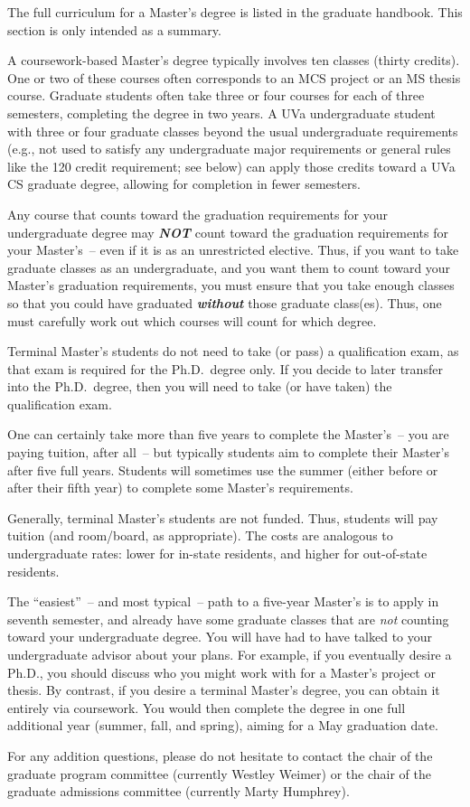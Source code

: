 
The full curriculum for a Master's degree is listed in the graduate
handbook.
This section is only intended as a summary.

A coursework-based Master's degree typically involves ten classes (thirty
credits). One or two of these courses often corresponds to an MCS project
or an MS thesis course.  Graduate students often take three or four courses
for each of three semesters, completing the degree in two years. A UVa
undergraduate student with three or four graduate classes beyond the usual
undergraduate requirements (e.g., not used to satisfy any undergraduate
major requirements or general rules like the 120 credit requirement; see
below) can apply those credits toward a UVa CS graduate degree, allowing
for completion in fewer semesters. 

Any course that counts toward the graduation requirements for your
undergraduate degree may {\em\bf NOT} count toward the graduation
requirements for your Master's~-- even if it is as an unrestricted
elective.  Thus, if you want to take graduate classes as an undergraduate,
and you want them to count toward your Master's graduation requirements,
you must ensure that you take enough classes so that you could have
graduated {\em\bf without} those graduate class(es).  Thus, one must
carefully work out which courses will count for which degree. 

Terminal Master's students do not need to take (or pass) a qualification
exam, as that exam is required for the Ph.D.\ degree only.  If you decide
to later transfer into the Ph.D.\ degree, then you will need to take (or
have taken) the qualification exam.

One can certainly take more than five years to complete the Master's~--
you are paying tuition, after all~-- but typically students aim to
complete their Master's after five full years. Students will sometimes use
the summer (either before or after their fifth year) to complete some
Master's requirements.  


Generally, terminal Master's students are not funded.  Thus, students will
pay tuition (and room/board, as appropriate).  The costs are analogous to
undergraduate rates: lower for in-state residents, and higher for
out-of-state residents.

The ``easiest''~-- and most typical~-- path to a five-year Master's is to
apply in seventh semester, and already have some graduate classes that are
\emph{not} counting toward your undergraduate degree. You will have had to
have talked to your undergraduate advisor about your plans. For example,
if you eventually desire a Ph.D., you should discuss who you might work
with for a Master's project or thesis. By contrast, if you desire a
terminal Master's degree, you can obtain it entirely via coursework. 
You would then complete the degree in one full additional year (summer,
fall, and spring), aiming for a May graduation date.

For any addition questions, please do not hesitate to contact the chair of
the graduate program committee (currently Westley Weimer) or the chair of
the graduate admissions committee (currently Marty Humphrey).
